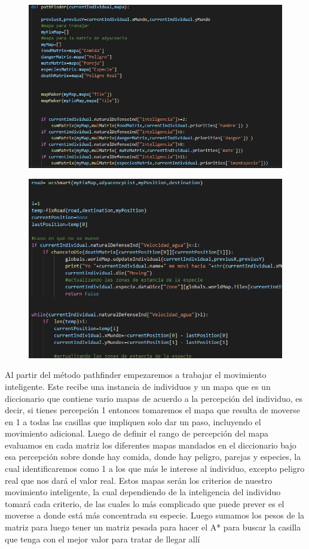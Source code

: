 \documentclass{llncs}
\begin{document}
\begin{figure}
	\centering
	\includegraphics[width=0.7\linewidth]{imagenesMisc/pathfinder1}
	\label{fig:pathfinder1}
\end{figure}
\begin{figure}
	\centering
	\includegraphics[width=0.7\linewidth]{imagenesMisc/pathfinder2}
	\label{fig:pathfinder2}
\end{figure}

Al partir del método pathfinder empezaremos a trabajar el movimiento inteligente. Este recibe una instancia de individuos y un mapa que es un diccionario que contiene vario mapas de acuerdo a la percepción del individuo, es decir, si tienes percepción 1 entonces tomaremos el mapa que resulta de moverse en 1 a todas las casillas que impliquen solo dar un paso, incluyendo el movimiento adicional.
\newline
\newline
Luego de definir el rango de percepción del mapa evaluamos en cada matriz los diferentes mapas mandados en el diccionario bajo esa percepción sobre donde hay comida, donde hay peligro, parejas y especies, la cual identificaremos como 1 a los que más le interese al individuo, excepto peligro real que nos dará el valor real. Estos mapas serán los criterios de nuestro movimiento inteligente, la cual dependiendo de la inteligencia del individuo tomará cada criterio, de las cuales lo más complicado que puede prever es el moverse a donde está más concentrada su especie.
\newline
\newline
Luego sumamos los pesos de la matriz para luego tener un matriz pesada para hacer el A* para buscar la casilla que tenga con el mejor valor para tratar de llegar allí
\end{document}
